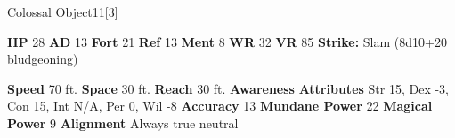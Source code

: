   

  \begin{monsubsection}{Colossal Object}{11}[3]
    \vspace{-1em}\vspace{-1em}
    \vspace{0em}

    
    

    \begin{spellcontent}
      \begin{spelltargetinginfo}
        \pari \textbf{HP} 28 \monsep
          \textbf{AD} 13 \monsep
          \textbf{Fort} 21 \monsep
          \textbf{Ref} 13 \monsep
          \textbf{Ment} 8
        \pari \textbf{WR} 32 \monsep
        \textbf{VR} 85
        \pari \textbf{Strike:}
            Slam  (8d10+20 bludgeoning)
      \end{spelltargetinginfo}
    \end{spellcontent}
    \begin{monsterfooter}
      \pari \textbf{Speed} 70 ft. \monsep
        \textbf{Space} 30 ft. \monsep
        \textbf{Reach} 30 ft.
      \pari \textbf{Awareness} 
      \pari \textbf{Attributes}
        Str 15, Dex -3,
        Con 15, Int N/A,
        Per 0, Wil -8
      \pari \textbf{Accuracy} 13 \monsep
        \textbf{Mundane Power} 22 \monsep
      \textbf{Magical Power} 9
      \pari \textbf{Alignment} Always true neutral
    \end{monsterfooter}
  \end{monsubsection}
  
  
  
